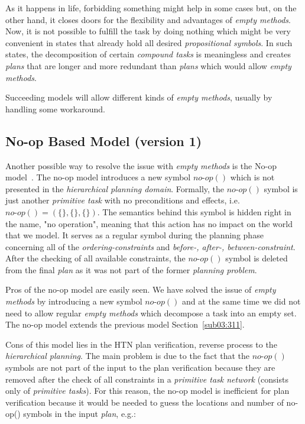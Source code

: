 \medskip\noindent
As it happens in life, forbidding something might help in some cases but, on the other hand, it closes doors for the flexibility and advantages of \emph{empty methods}. Now, it is not possible to fulfill the task by doing nothing which might be very convenient in states that already hold all desired \emph{propositional symbols}. In such states, the decomposition of certain \emph{compound tasks} is meaningless and creates \emph{plans} that are longer and more redundant than \emph{plans} which would allow \emph{empty methods}.

\medskip\noindent
Succeeding models will allow different kinds of \emph{empty methods}, usually by handling some workaround.

\subsection{No-op Based Model (version 1)}

\medskip\noindent
Another possible way to resolve the issue with \emph{empty methods} is the No-op model~\cite{ondrckova2023semantics}. The no-op model introduces a new symbol $no\text{-}op()$ which is not presented in the \emph{hierarchical planning domain}. Formally, the $no\text{-}op()$ symbol is just another \emph{primitive task} with no preconditions and effects, i.e. $no\text{-}op() = (\{\}, \{\}, \{\})$. The semantics behind this symbol is hidden right in the name, "no operation", meaning that this action has no impact on the world that we model. It serves as a regular symbol during the planning phase concerning all of the \emph{ordering-constraints} and \emph{before-, after-, between-constraint}. After the checking of all available constraints, the $no\text{-}op()$ symbol is deleted from the final \emph{plan} as it was not part of the former \emph{planning problem}.

\medskip\noindent
Pros of the no-op model are easily seen. We have solved the issue of \emph{empty methods} by introducing a new symbol $no\text{-}op()$ and at the same time we did not need to allow regular \emph{empty methods} which decompose a task into an empty set. The no-op model extends the previous model Section~\ref{sub03:311}.

\medskip\noindent
Cons of this model lies in the HTN plan verification, reverse process to the \emph{hierarchical planning}. The main problem is due to the fact that the $no\text{-}op()$ symbols are not part of the input to the plan verification because they are removed after the check of all constraints in a \emph{primitive task network} (consists only of \emph{primitive tasks}). For this reason, the no-op model is inefficient for plan verification because it would be needed to guess the locations and number of no-op() symbols in the input \emph{plan}, e.g.:

